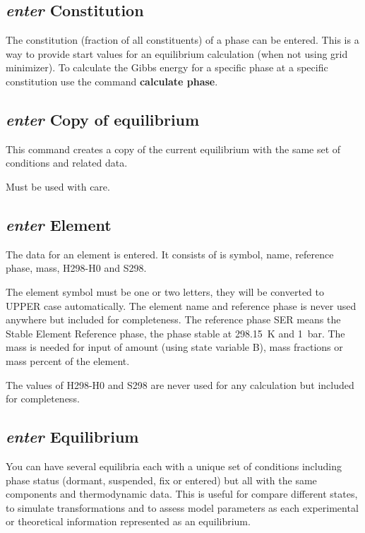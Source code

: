 \documentclass[11pt]{article}
\begin{document}
\hypertarget{Enter constitution}{}
\subsection{{\em enter} Constitution}

The constitution (fraction of all constituents) of a phase can be
entered.  This is a way to provide start values for an equilibrium
calculation (when not using grid minimizer).  To calculate the Gibbs
energy for a specific phase at a specific constitution use the command
{\bf calculate phase}.

\hypertarget{Enter copyof}{}
\subsection{{\em enter} Copy of equilibrium}

This command creates a copy of the current equilibrium with the same
set of conditions and related data.

Must be used with care.

\hypertarget{Enter element}{}
\subsection{{\em enter} Element}

The data for an element is entered.  It consists of is symbol, name,
reference phase, mass, H298-H0 and S298.

The element symbol must be one or two letters, they will be converted
to UPPER case automatically.  The element name and reference phase is
never used anywhere but included for completeness.  The reference
phase SER means the Stable Element Reference phase, the phase stable
at 298.15~K and 1~bar.  The mass is needed for input of amount (using
state variable B), mass fractions or mass percent of the element.

The values of H298-H0 and S298 are never used for any calculation but
included for completeness.

\hypertarget{Enter equilibrium}{}
\subsection{{\em enter} Equilibrium}

You can have several equilibria each with a unique set of conditions
including phase status (dormant, suspended, fix or entered) but all
with the same components and thermodynamic data.  This is useful for
compare different states, to simulate transformations and to assess
model parameters as each experimental or theoretical information
represented as an equilibrium.
\end{document}
